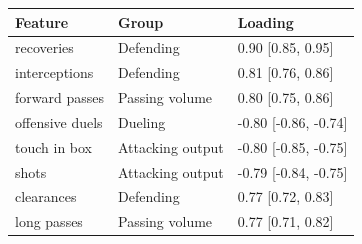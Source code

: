 
\begin{tabular}{lll}
\toprule
Feature & Group & Loading\\
\midrule
recoveries & Defending & 0.90 [0.85, 0.95]\\
interceptions & Defending & 0.81 [0.76, 0.86]\\
forward passes & Passing volume & 0.80 [0.75, 0.86]\\
offensive duels & Dueling & -0.80 [-0.86, -0.74]\\
touch in box & Attacking output & -0.80 [-0.85, -0.75]\\
shots & Attacking output & -0.79 [-0.84, -0.75]\\
clearances & Defending & 0.77 [0.72, 0.83]\\
long passes & Passing volume & 0.77 [0.71, 0.82]\\
\bottomrule
\end{tabular}
